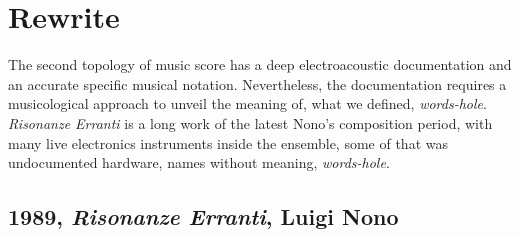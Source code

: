 \documentclass[twoside,a4paper]{article}
\begin{document}
\section{Rewrite}
\label{sec:rewriting}

The second topology of music score has a deep electroacoustic documentation and an accurate specific musical notation. Nevertheless, the documentation requires a musicological approach to unveil the meaning of, what we defined, \emph{words-hole}. \emph{Risonanze Erranti} is a long work of the latest Nono's composition period, with many live electronics instruments inside the ensemble, some of that was undocumented hardware, names without meaning, \emph{words-hole}. 


\subsection{1989, \emph{Risonanze Erranti}, Luigi Nono}
\end{document}
